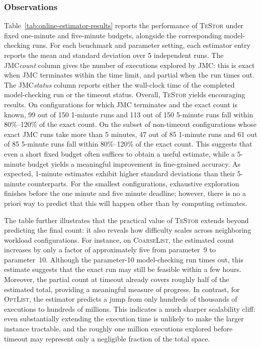 \documentclass[acmsmall]{acmart}
\newcommand{\testor}{\textsc{TeStor}\xspace}
\newcommand{\jmc}{\textsc{JMC}\xspace}
\begin{document}
\subsubsection*{Observations}
Table~\ref{tab:online-estimator-results} reports the performance of \testor under fixed one-minute and five-minute budgets, alongside the corresponding model-checking runs. For each benchmark and parameter setting, each estimator entry reports the mean and standard deviation over 5 independent runs. The \jmc \emph{count} column gives the number of executions explored by \jmc: this is exact when \jmc terminates within the time limit, and partial when the run times out. The \jmc \emph{status} column reports either the wall-clock time of the completed model-checking run or the timeout status.
Overall, \testor yields encouraging results. On configurations for which \jmc terminates and the exact count is known, 99 out of 150 1-minute runs and 113 out of 150 5-minute runs fall within 80\%–120\% of the exact count.
On the subset of non-timeout configurations whose exact \jmc runs take more than 5 minutes, 47 out of 85 1-minute runs and 61 out of 85 5-minute runs fall within 80\%–120\% of the exact count. This suggests that even a short fixed budget often suffices to obtain a useful estimate, while a 5-minute budget yields a meaningful improvement in fine-grained accuracy. As expected, 1-minute estimates exhibit higher standard deviations than their 5-minute counterparts.
For the smallest configurations, exhaustive exploration finishes before the one minute and five minute deadline; however, there is no a priori way to predict that this will happen other than by computing estimates.

The table further illustrates that the practical value of  \testor extends beyond predicting the final count: it also reveals how difficulty scales across neighboring workload configurations. For instance, on \textsc{CoarseList}, the estimated count increases by only a factor of approximately five from parameter~9 to parameter~10. Although the parameter-10 model-checking run times out, this estimate suggests that the exact run may still be feasible within a few hours. Moreover, the partial count at timeout already covers roughly half of the estimated total, providing a meaningful measure of progress. In contrast, for \textsc{OptList}, the estimator predicts a jump from only hundreds of thousands of executions to hundreds of millions. This indicates a much sharper scalability cliff: even substantially extending the execution time is unlikely to make the larger instance tractable, and the roughly one million executions explored before timeout may represent only a negligible fraction of the total space.
\end{document}
